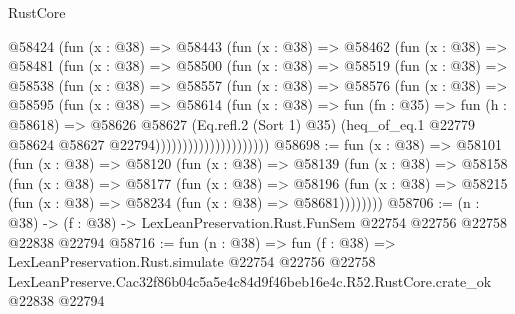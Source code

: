 \begin{lexlean}{RustCore}
\begin{coremodule}
                    @58424
                      (fun (x : @38) =>
                      @58443
                        (fun (x : @38) =>
                        @58462
                          (fun (x : @38) =>
                          @58481
                            (fun (x : @38) =>
                            @58500
                              (fun (x : @38) =>
                              @58519
                                (fun (x : @38) =>
                                @58538
                                  (fun (x : @38) =>
                                  @58557
                                    (fun (x : @38) =>
                                    @58576
                                      (fun (x : @38) =>
                                      @58595
                                        (fun (x : @38) =>
                                        @58614
                                          (fun (x : @38) =>
                                          fun (fn : @35) =>
                                          fun (h : @58618) =>
                                          @58626
                                            @58627
                                            (Eq.refl.{2} (Sort 1) @35)
                                            (heq_of_eq.{1}
                                              @22779
                                              @58624
                                              @58627
                                              @22794)))))))))))))))))))))
@58698 := fun (x : @38) =>
  @58101
    (fun (x : @38) =>
    @58120
      (fun (x : @38) =>
      @58139
        (fun (x : @38) =>
        @58158
          (fun (x : @38) =>
          @58177
            (fun (x : @38) =>
            @58196
              (fun (x : @38) => @58215 (fun (x : @38) => @58234 (fun (x : @38) => @58681))))))))
@58706 := (n : @38) ->
  (f : @38) -> LexLeanPreservation.Rust.FunSem @22754 @22756 @22758 @22838 @22794
@58716 := fun (n : @38) =>
  fun (f : @38) =>
  LexLeanPreservation.Rust.simulate
    @22754
    @22756
    @22758
    LexLeanPreserve.Cac32f86b04c5a5e4c84d9f46beb16e4c.R52.RustCore.crate_ok
    @22838
    @22794
\end{coremodule}
\end{lexlean}
